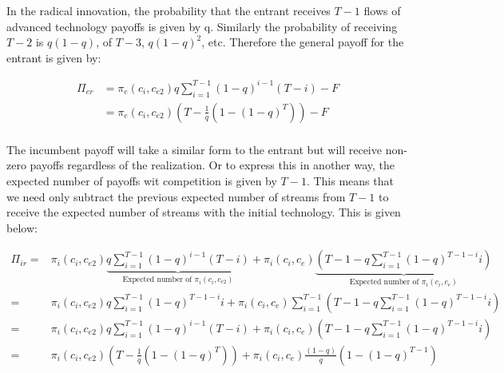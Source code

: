 In the radical innovation, the probability that the entrant receives $T-1$ flows of advanced technology payoffs is given by q. Similarly the probability of receiving $T-2$ is $q(1-q)$, of $T-3$, $q(1-q)^2$, etc. Therefore the general payoff for the entrant is given by:

\begin{align*}
\Pi_{er} & = 
\pi_{e}(c_i,c_{e2}) q \sum_{i=1}^{T-1} (1-q)^{i-1} (T-i) -F \\
&= \pi_{e}(c_i,c_{e2}) \left( T- \frac{1}{q} \left( 1-(1-q)^{T} \right) \right) -F \\
\end{align*}

The incumbent payoff will take a similar form to the entrant but will receive non-zero payoffs regardless of the realization. Or to express this in another way, the expected number of payoffs wit competition is given by $T-1$. This means that we need only subtract the previous expected number of streams from $T-1$ to receive the expected number of streams with the initial technology. This is given below: 


\begin{align*}
\Pi_{ir} =& \pi_{i}(c_i,c_{e2}) \underbrace{q \sum_{i=1}^{T-1} (1-q)^{i-1} (T-i)}_{\text{Expected number of } \pi_{i}(c_i,c_{e2})}+ \pi_i(c_i,c_e) \underbrace{ (T-1-q \sum_{i=1}^{T-1} (1-q)^{T-1-i} i)}_{\text{Expected number of } \pi_{i}(c_i,c_{e})}
\\
=& \pi_{i}(c_i,c_{e2}) q \sum_{i=1}^{T-1} (1-q)^{T-1-i} i + \pi_i(c_i,c_e)  \sum_{i=1}^{T-1} (T-1-q \sum_{i=1}^{T-1} (1-q)^{T-1-i} i)
\\ =& \pi_{i}(c_i,c_{e2})q \sum_{i=1}^{T-1} (1-q)^{i-1} (T-i)+ \pi_i(c_i,c_e) (T-1-q \sum_{i=1}^{T-1} (1-q)^{T-1-i} i)
\\ =&\pi_{i}(c_i,c_{e2}) \left( T - \frac{1}{q} \left( 1-(1-q)^{T} \right) \right)
+ \pi_i(c_i,c_e) \frac{(1-q)}{q} \left( 1-(1-q)^{T-1} \right) \\
\end{align*}

